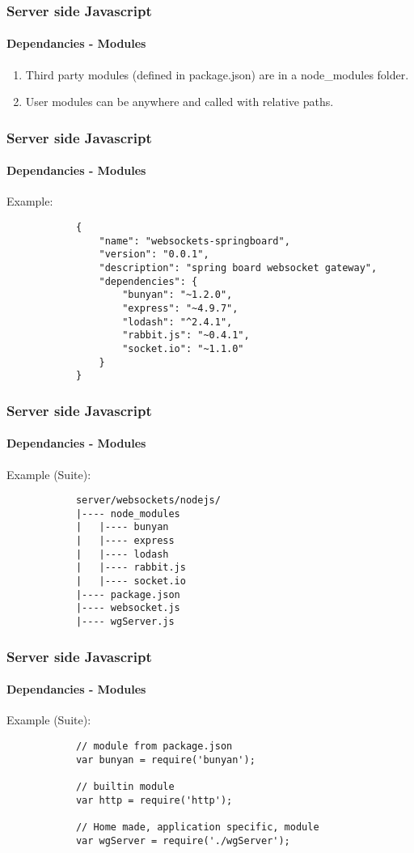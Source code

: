 \documentclass{beamer}
\begin{document}
	\begin{frame}
		\frametitle{Server side Javascript}
		\framesubtitle{Dependancies - Modules}

		\begin{enumerate}
			\item Third party modules (defined in package.json) are in a
				node\_modules folder.
			\item User modules can be anywhere and called with relative paths.
		\end{enumerate}
	\end{frame}

	\begin{frame}[fragile]
		\frametitle{Server side Javascript}
		\framesubtitle{Dependancies - Modules}

		Example:
		\begin{verbatim}
			{
			    "name": "websockets-springboard",
			    "version": "0.0.1",
			    "description": "spring board websocket gateway",
			    "dependencies": {
			        "bunyan": "~1.2.0",
			        "express": "~4.9.7",
			        "lodash": "^2.4.1",
			        "rabbit.js": "~0.4.1",
			        "socket.io": "~1.1.0"
			    }
			}
		\end{verbatim}
	\end{frame}

	\begin{frame}[fragile]
		\frametitle{Server side Javascript}
		\framesubtitle{Dependancies - Modules}

		Example (Suite):
		\begin{verbatim}
			server/websockets/nodejs/
			|---- node_modules
			|   |---- bunyan
			|   |---- express
			|   |---- lodash
			|   |---- rabbit.js
			|   |---- socket.io
			|---- package.json
			|---- websocket.js
			|---- wgServer.js
		\end{verbatim}
	\end{frame}

	\begin{frame}[fragile]
		\frametitle{Server side Javascript}
		\framesubtitle{Dependancies - Modules}

		Example (Suite):
		\begin{verbatim}
			// module from package.json
			var bunyan = require('bunyan');

			// builtin module
			var http = require('http');

			// Home made, application specific, module
			var wgServer = require('./wgServer');
		\end{verbatim}
	\end{frame}
\end{document}

